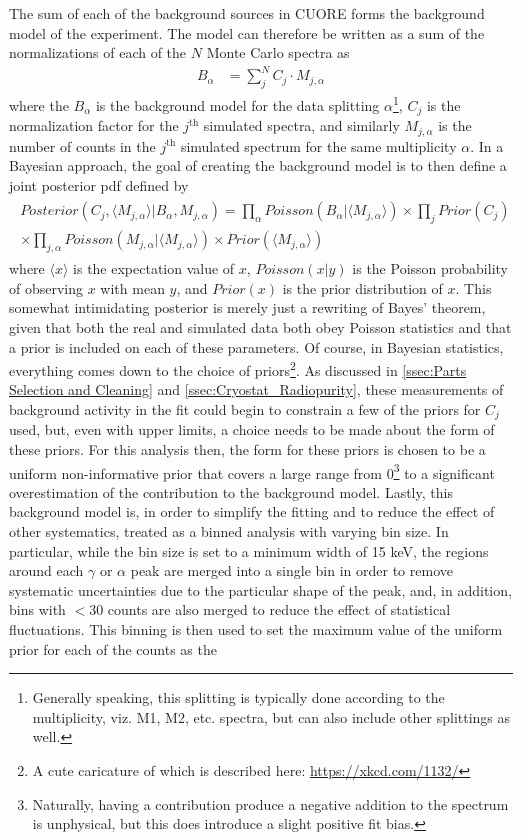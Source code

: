 The sum of each of the background sources in CUORE forms the background model of the experiment.
The model can therefore be written as a sum of the normalizations of each of the $N$ Monte Carlo spectra as
\begin{align}
    B_\alpha &= \sum_j^N C_{j} \cdot M_{j,\alpha} 
\end{align}
where the $B_{\alpha}$ is the background model for the data splitting $\alpha$\footnote{Generally speaking, this splitting is typically done according to the multiplicity, viz. M1, M2, etc. spectra, but can also include other splittings as well.}, $C_{j}$ is the normalization factor for the $j^{\textrm{th}}$ simulated spectra, and similarly $M_{j,\alpha}$ is the number of counts in the $j^{\textrm{th}}$ simulated spectrum for the same multiplicity $\alpha$.
In a Bayesian approach, the goal of creating the background model is to then define a joint posterior pdf defined by
\begin{align}
\begin{split}
        Posterior(C_j, \langle M_{j,\alpha}\rangle|B_\alpha, M_{j,\alpha}) = \prod_\alpha Poisson(B_\alpha|\langle M_{j,\alpha}\rangle)\times \prod_j Prior(C_j) \\ \times \prod_{j, \alpha}Poisson(M_{j,\alpha}|\langle M_{j,\alpha}\rangle) \times Prior(\langle M_{j,\alpha}\rangle)
\end{split}
\end{align}
where $\langle x \rangle$ is the expectation value of $x$, $Poisson(x|y)$ is the Poisson probability of observing $x$ with mean $y$, and $Prior(x)$ is the prior distribution of $x$.
This somewhat intimidating posterior is merely just a rewriting of Bayes' theorem, given that both the real and simulated data both obey Poisson statistics and that a prior is included on each of these parameters.
Of course, in Bayesian statistics, everything comes down to the choice of priors\footnote{\RaggedRight A cute caricature of which is described here: \url{https://xkcd.com/1132/}}.
As discussed in \autoref{ssec:Parts Selection and Cleaning} and \autoref{ssec:Cryostat_Radiopurity}, these measurements of background activity in the fit could begin to constrain a few of the priors for $C_j$ used, but, even with upper limits, a choice needs to be made about the form of these priors.
For this analysis then, the form for these priors is chosen to be a uniform non-informative prior that covers a large range from 0\footnote{Naturally, having a contribution produce a negative addition to the spectrum is unphysical, but this does introduce a slight positive fit bias.} to a significant overestimation of the contribution to the background model.
Lastly, this background model is, in order to simplify the fitting and to reduce the effect of other systematics, treated as a binned analysis with varying bin size.
In particular, while the bin size is set to a minimum width of 15 keV, the regions around each $\gamma$ or $\alpha$ peak are merged into a single bin in order to remove systematic uncertainties due to the particular shape of the peak, and, in addition, bins with $<30$ counts are also merged to reduce the effect of statistical fluctuations.
This binning is then used to set the maximum value of the uniform prior for each of the counts as the


